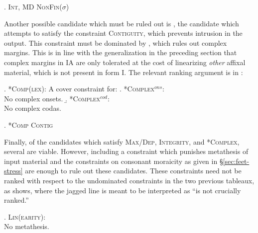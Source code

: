 \documentclass[12pt,twoside,letterpaper]{article}
\begin{document}
\ex. \textsc{Int}, \textsc{MD} \OTdom \textsc{NonFin}($\sigma$)\\\begin{OTtableau}{3}
  \OTcandrow*[\OThand]{[(marr)]}{ , ,*}
\end{OTtableau}

Another possible candidate which must be ruled out is {\em {}}, the candidate which attempts to satisfy the constraint \textsc{Contiguity}, which prevents intrusion in the output. This constraint must be dominated by \Next, which rules out complex margins. This is in line with the generalization in the preceding section that complex margins in IA are only tolerated at the cost of linearizing \emph{other} affixal material, which is not present in form I. The relevant ranking argument is in \NNext:

\ex. \label{ex:complex}\textsc{*Comp(lex)}: A cover constraint for:
\a. \label{ex:complex-ons}\textsc{*Complex}$^{ons}$:\\No complex onsets.
\b. \label{ex:complex-cod}\textsc{*Complex}$^{cod}$:\\No complex codas.


\ex. \textsc{*Comp} \OTdom \textsc{Contig}\\\begin{OTtableau}{2}
  \OTcandrow*[\OThand]{[(marr)]}{ ,*}
  \OTcandrow*{[(amr)]}{*!, }
\end{OTtableau}

Finally, of the candidates which satisfy \textsc{Max/Dep}, \textsc{Integrity}, and \textsc{*Complex}, several are viable. However, including a constraint which punishes metathesis of input material \Next and the constraints on consonant moraicity as given in \S{\ref{sec:feet-stress}} are enough to rule out these candidates. These constraints need not be ranked with respect to the undominated constraints in the two previous tableaux, as \NNext shows, where the jagged line is meant to be interpreted as ``is not crucially ranked.''

\ex. \label{ex:linearity}\textsc{Lin(earity)}:\\No metathesis.

\pagebreak
\end{document}

